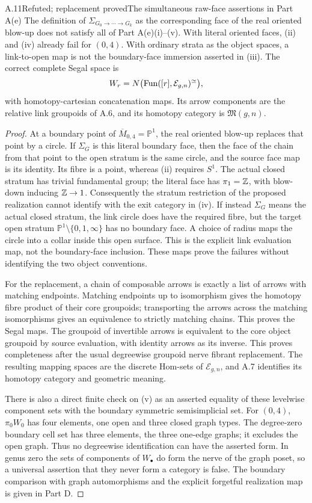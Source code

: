 \begin{result}{A.11}{Refuted; replacement proved}{The simultaneous raw-face assertions in Part A(e)}
The definition of $\Sigma_{G_0\to\cdots\to G_k}$ as the corresponding face of the real oriented blow-up does not satisfy all of Part A(e)(i)--(v). With literal oriented faces, (ii) and (iv) already fail for $(0,4)$. With ordinary strata as the object spaces, a link-to-open map is not the boundary-face immersion asserted in (iii). The correct complete Segal space is
\[
 W_r=N\bigl(\operatorname{Fun}([r],\mathcal E_{g,n})^{\simeq}\bigr),
\]
with homotopy-cartesian concatenation maps. Its arrow components are the relative link groupoids of A.6, and its homotopy category is $\mathfrak M(g,n)$.
\end{result}
\begin{proof}
At a boundary point of $\overline M_{0,4}=\mathbb P^1$, the real oriented blow-up replaces that point by a circle. If $\Sigma_G$ is this literal boundary face, then the face of the chain from that point to the open stratum is the same circle, and the source face map is its identity. Its fibre is a point, whereas (ii) requires $S^1$. The actual closed stratum has trivial fundamental group; the literal face has $\pi_1=\mathbb Z$, with blow-down inducing $\mathbb Z\to1$. Consequently the stratum restriction of the proposed realization cannot identify with the exit category in (iv). If instead $\Sigma_G$ means the actual closed stratum, the link circle does have the required fibre, but the target open stratum $\mathbb P^1\setminus\{0,1,\infty\}$ has no boundary face. A choice of radius maps the circle into a collar inside this open surface. This is the explicit link evaluation map, not the boundary-face inclusion. These maps prove the failures without identifying the two object conventions.

For the replacement, a chain of composable arrows is exactly a list of arrows with matching endpoints. Matching endpoints up to isomorphism gives the homotopy fibre product of their core groupoids; transporting the arrows across the matching isomorphisms gives an equivalence to strictly matching chains. This proves the Segal maps. The groupoid of invertible arrows is equivalent to the core object groupoid by source evaluation, with identity arrows as its inverse. This proves completeness after the usual degreewise groupoid nerve fibrant replacement. The resulting mapping spaces are the discrete Hom-sets of $\mathcal E_{g,n}$, and A.7 identifies its homotopy category and geometric meaning.

There is also a direct finite check on (v) as an asserted equality of these levelwise component sets with the boundary symmetric semisimplicial set. For $(0,4)$, $\pi_0W_0$ has four elements, one open and three closed graph types. The degree-zero boundary cell set has three elements, the three one-edge graphs; it excludes the open graph. Thus no degreewise identification can have the asserted form. In genus zero the sets of components of $W_\bullet$ do form the nerve of the graph poset, so a universal assertion that they never form a category is false. The boundary comparison with graph automorphisms and the explicit forgetful realization map is given in Part D.
\end{proof}

